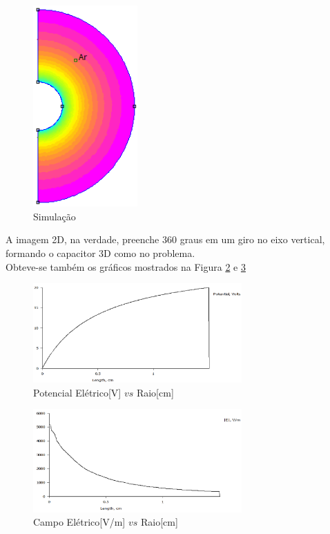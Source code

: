 \documentclass[a4paper]{article}
\begin{document}
\begin{multicols}{2}
	\begin{figure} [H]
		\centering
		\caption{Simulação\label{fig:simulacao}}
		\includegraphics[width=4cm,fbox]{latex/Screenshot_1.png}
	\end{figure}

	A imagem 2D, na verdade, preenche 360 graus em um giro no eixo vertical, formando o capacitor 3D como no problema.\\
	
	Obteve-se também os gráficos mostrados na Figura \ref{fig:potencial_simu} e \ref{fig:campo_simu}
	
	\begin{figure} [H]
		\centering
		\caption{Potencial Elétrico[V] $vs$ Raio[cm]\label{fig:potencial_simu}}
		\includegraphics[width=8cm ,fbox]{latex/potencial1.png}
	\end{figure}

\begin{figure} [H]
	\centering
	\caption{Campo Elétrico[V/m] $vs$ Raio[cm]\label{fig:campo_simu}}
	\includegraphics[width=8cm ,fbox]{latex/campo1.png}
\end{figure}
	

\end{multicols}
\end{document}
